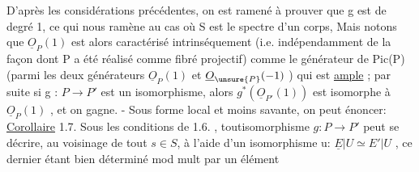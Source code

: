 D'après les considérations précédentes, on est ramené à prouver
que g est de degré 1, ce qui nous ramène au cas où S est le spectre d'un
corps, Mais notons que $\underline{O}_P(1)$ est alors caractérisé intrinséquement (i.e.
indépendamment de la façon dont P a été réalisé comme fibré projectif)
comme le générateur de Pic(P) (parmi les deux générateurs $\underline{O}_P(1)$ et
$\underline{O}_{\unsure{P}}(-1)$ ) qui est \uline{ample} ; par suite si g : $P\to P'$ est un isomorphisme,
alors $g^{*}(\underline{O}_{P'}(1))$ est isomorphe à $\underline{O}_P(1)$ , et on gagne. - Sous forme local
et moins savante, on peut énoncer:
\uline{Corollaire} 1.7. Sous les conditions de 1.6. , toutisomorphisme $g:P\to P'$
peut se décrire, au voisinage de tout $s\in S$, à l'aide d'un isomorphisme
u: $\underline{E}|U \simeq E'|U$ , ce dernier étant bien déterminé mod mult par un élément

